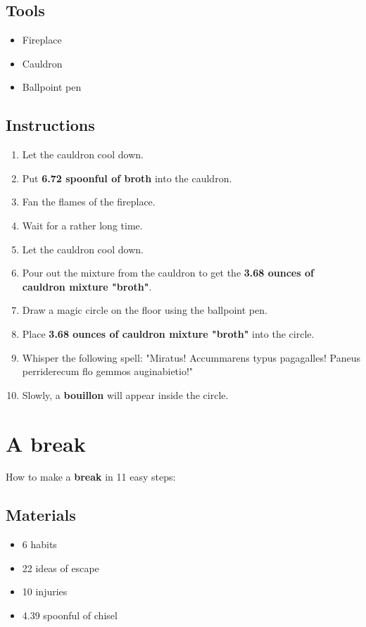 \documentclass{article}
\begin{document}
\subsection{Tools}\begin{itemize}
\item 
Fireplace
\item 
Cauldron
\item 
Ballpoint pen
\end{itemize}
\subsection{Instructions}\begin{enumerate}
\item 
Let the cauldron cool down.
\item 
Put \textbf{6.72 spoonful of broth} into the cauldron.
\item 
Fan the flames of the fireplace.
\item 
Wait for a rather long time.
\item 
Let the cauldron cool down.
\item 
Pour out the mixture from the cauldron to get the \textbf{3.68 ounces of cauldron mixture "broth"}.
\item 
Draw a magic circle on the floor using the ballpoint pen.
\item 
Place \textbf{3.68 ounces of cauldron mixture "broth"} into the circle.
\item 
Whisper the following spell: "Miratus! Accummarens typus pagagalles! Paneus perriderecum flo gemmos auginabietio!"
\item 
Slowly, a \textbf{bouillon} will appear inside the circle.
\end{enumerate}
\newpage
\section{A break}How to make a \textbf{break} in 11 easy steps:

\subsection{Materials}\begin{itemize}
\item 
6 habits
\item 
22 ideas of escape
\item 
10 injuries
\item 
4.39 spoonful of chisel
\end{itemize}
\end{document}
